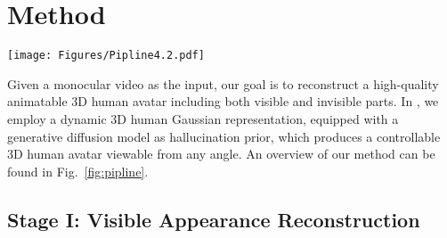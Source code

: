 

\section{Method}
\label{sec:method}

\begin{figure*}
\centering
\texttt{[image: Figures/Pipline4.2.pdf]} %

\caption{Overview of WonderHuman. (1) In stage I, we reconstruct 3D Gaussians and appearances for visible human parts from partial-view videos. We start with optimizable feature vectors named canonical features capturing human geometry and appearance in a canonical space. Then, we use a Gaussian Decoder to predict Gaussian parameters and combine the Linear Blend Skinning (LBS) function with the Gaussian Splatting to render the dynamic 3D human in the observation space. 
(2) In Stage II, we hallucinate the invisible parts of the avatar using a Dual-space Optimization technique. 
We render images of the human avatar from various novel viewpoints and apply an SDS loss to learn the unseen appearances. Additionally, a normal predictor is utilized to generate normal maps that guide geometry reconstruction, while View Selection and Pose Feature Injection strategies are employed to ensure consistent appearance fusion.}
\vspace{-3mm}
\label{fig:pipline}

\end{figure*}


Given a monocular video as the input, our goal is to reconstruct a high-quality animatable 3D human avatar including both visible and invisible parts. In \name, we employ a dynamic 3D human Gaussian representation, equipped with a generative diffusion model as hallucination prior, which produces a controllable 3D human avatar viewable from any angle. An overview of our method can be found in Fig.~\ref{fig:pipline}.

\subsection{Stage I: Visible Appearance Reconstruction}
